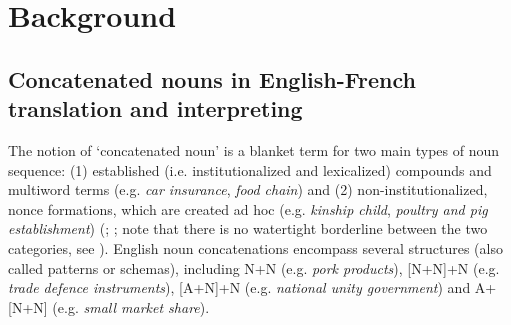 \documentclass[output=paper]{langscibook}
\begin{document}
\section{Background}\label{sec:lefer:2}
\subsection{Concatenated nouns in English-French translation and interpreting} \label{sec:lefer:2.1}

The notion of ‘concatenated noun’ is a blanket term for two main types of noun sequence: (1) established (i.e. institutionalized and lexicalized) compounds and multiword terms (e.g. \textit{car insurance}, \textit{food chain}) and (2) non-institutionalized, nonce formations, which are created ad hoc (e.g. \textit{kinship child}, \textit{poultry and pig establishment}) (\citealt[cf.][45--50]{Bauer1983}; \citealt{Hohenhaus2005}; note that there is no watertight borderline between the two categories, see \citealt{Bauer1998}). English noun concatenations encompass several structures (also called patterns or schemas), including N+N (e.g. \textit{pork products}), [N+N]+N (e.g. \textit{trade defence instruments}), [A+N]+N (e.g. \textit{national unity government}) and A+[N+N] (e.g. \textit{small market share}).
\end{document}
